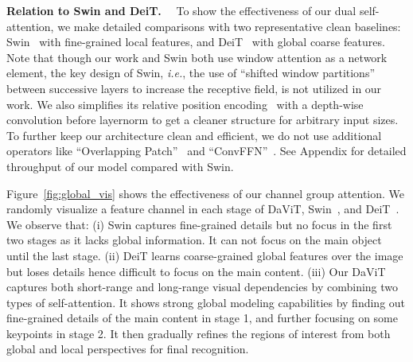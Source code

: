 \documentclass[runningheads]{llncs}
\newcommand{\ie}{\emph{i.e.}}
\begin{document}
\noindent \textbf{Relation to Swin and DeiT.}~~
To show the effectiveness of our dual self-attention, we make detailed comparisons with two representative clean baselines: Swin~\cite{liu2021swin} with fine-grained local features, and DeiT~\cite{touvron2021training} with global coarse features.
Note that though our work and Swin both use window attention as a network element, the key design of Swin, \ie, the use of ``shifted window partitions'' between successive layers to increase the receptive field, is not utilized in our work.
We also simplifies its relative position encoding~\cite{chu2021conditional} with a depth-wise convolution before layernorm to get a cleaner structure for arbitrary input sizes.
To further keep our architecture clean and efficient, we do not use additional operators like ``Overlapping Patch''~\cite{wu2021cvt,wang2021pvtv2} and ``ConvFFN''~\cite{yuan2021hrformer,xie2021segformer}.
See Appendix for detailed throughput of our model compared with Swin.


Figure~\ref{fig:global_vis} shows the effectiveness of our channel group attention.
We randomly visualize a feature channel in each stage of DaViT, Swin~\cite{liu2021swin}, and DeiT~\cite{touvron2021training}. We observe that:
(i) Swin captures fine-grained details but no focus in the first two stages as it lacks global information. It can not focus on the main object until the last stage.
(ii) DeiT learns coarse-grained global features over the image but loses details hence difficult to focus on the main content.
(iii) Our DaViT captures both short-range and long-range visual dependencies by combining two types of self-attention. It shows strong global modeling capabilities by finding out fine-grained details of the main content in stage 1, and further focusing on some keypoints in stage 2.
It then gradually refines the regions of interest from both global and local perspectives for final recognition.
\end{document}
